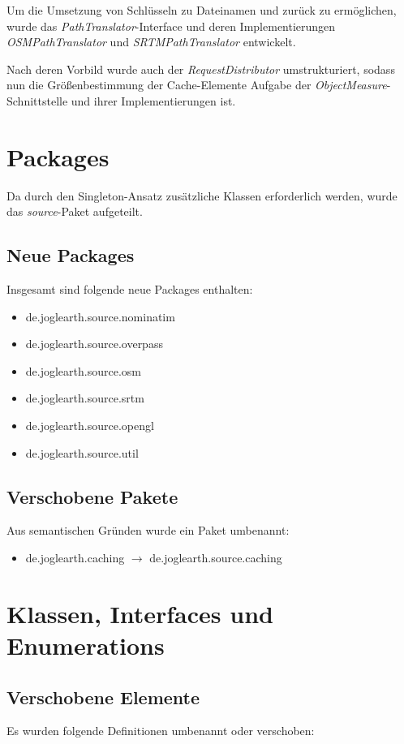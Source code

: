 \documentclass[10pt]{scrreprt}
\begin{document}
Um die Umsetzung von Schlüsseln zu Dateinamen und zurück zu ermöglichen, wurde das \textit{PathTranslator}-Interface und deren Implementierungen \textit{OSMPathTranslator} und \textit{SRTMPathTranslator} entwickelt. 

Nach deren Vorbild wurde auch der \textit{RequestDistributor} umstrukturiert, sodass nun die Größenbestimmung der Cache-Elemente Aufgabe der \textit{ObjectMeasure}-Schnittstelle und ihrer Implementierungen ist.

\section{Packages}

Da durch den Singleton-Ansatz zusätzliche Klassen erforderlich werden, wurde das \textit{source}-Paket aufgeteilt. 

\subsection*{Neue Packages}
Insgesamt sind folgende neue Packages enthalten:
\begin{itemize}
\item de.joglearth.source.nominatim
\item de.joglearth.source.overpass
\item de.joglearth.source.osm
\item de.joglearth.source.srtm
\item de.joglearth.source.opengl
\item de.joglearth.source.util
\end{itemize}

\subsection*{Verschobene Pakete}
Aus semantischen Gründen wurde ein Paket umbenannt:
\begin{itemize}
\item de.joglearth.caching $ \rightarrow $ de.joglearth.source.caching
\end{itemize}

\section{Klassen, Interfaces und Enumerations}

\subsection*{Verschobene Elemente}
Es wurden folgende Definitionen umbenannt oder verschoben:
\end{document}
